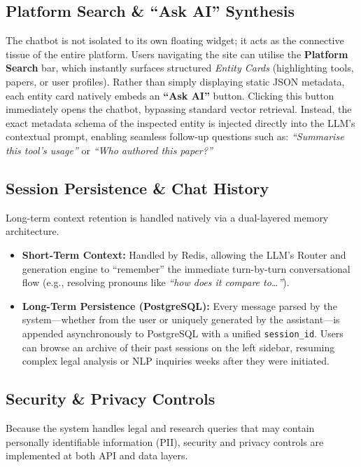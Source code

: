 \documentclass[12pt, a4paper]{article}
\begin{document}
\subsection{Platform Search \& ``Ask AI'' Synthesis}
The chatbot is not isolated to its own floating widget; it acts as the connective tissue of the entire platform. 
Users navigating the site can utilise the \textbf{Platform Search} bar, which instantly surfaces structured \textit{Entity Cards} (highlighting tools, papers, or user profiles). 
Rather than simply displaying static JSON metadata, each entity card natively embeds an \textbf{``Ask AI''} button. Clicking this button immediately opens the chatbot, bypassing standard vector retrieval. Instead, the exact metadata schema of the inspected entity is injected directly into the LLM's contextual prompt, enabling seamless follow-up questions such as: \textit{``Summarise this tool's usage''} or \textit{``Who authored this paper?''}

\subsection{Session Persistence \& Chat History}
Long-term context retention is handled natively via a dual-layered memory architecture.
\begin{itemize}[leftmargin=2em]
  \item \textbf{Short-Term Context:} Handled by Redis, allowing the LLM's Router and generation engine to ``remember'' the immediate turn-by-turn conversational flow (e.g., resolving pronouns like \textit{``how does it compare to\ldots''}).
  \item \textbf{Long-Term Persistence (PostgreSQL):} Every message parsed by the system---whether from the user or uniquely generated by the assistant---is appended asynchronously to PostgreSQL with a unified \texttt{session\_id}. Users can browse an archive of their past sessions on the left sidebar, resuming complex legal analysis or NLP inquiries weeks after they were initiated.
\end{itemize}

\subsection{Security \& Privacy Controls}
Because the system handles legal and research queries that may contain
personally identifiable information (PII), security and privacy controls are
implemented at both API and data layers.
\end{document}
